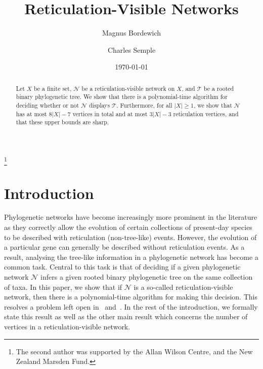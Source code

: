 \documentclass[11pt]{amsart}
\begin{document}
\title{Reticulation-Visible Networks}

\author{Magnus Bordewich}
\address{School of Engineering Computer Sciences, Durham University, Durham DH1 3LE, United Kingdom}

\author{Charles Semple}
\address{Biomathematics Research Centre, School of Mathematics and Statistics, University of Canterbury, Christchurch, New Zealand}

\thanks{The second author was supported by the Allan Wilson Centre, and the New Zealand Marsden Fund.}



\date{\today}

\begin{abstract}
Let $X$ be a finite set, ${{\mathcal N}}$ be a reticulation-visible network on $X$, and ${{\mathcal T}}$ be a rooted binary phylogenetic tree. We show that there is a polynomial-time algorithm for deciding whether or not ${{\mathcal N}}$ displays ${{\mathcal T}}$. Furthermore, for all $|X|\ge 1$, we show that ${{\mathcal N}}$ has at most $8|X|-7$ vertices in total and at most $3|X|-3$ reticulation vertices, and that these upper bounds are sharp.
\end{abstract}

\maketitle

\section{Introduction}

Phylogenetic networks have become increasingly more prominent in the literature as they correctly allow the evolution of certain collections of present-day species to be described with reticulation (non-tree-like) events. However, the evolution of a particular gene can generally be described without reticulation events. As a result, analysing the tree-like information in a phylogenetic network has become a common task. Central to this task is that of deciding if a given phylogenetic network ${{\mathcal N}}$ infers a given rooted binary phylogenetic tree on the same collection of taxa. In this paper, we show that if ${{\mathcal N}}$ is a so-called reticulation-visible network, then there is a polynomial-time algorithm for making this decision. This resolves a problem left open in~\cite{gam15} and~\cite{ier10}. In the rest of the introduction, we formally state this result as well as the other main result which concerns the number of vertices in a reticulation-visible network.
\end{document}
